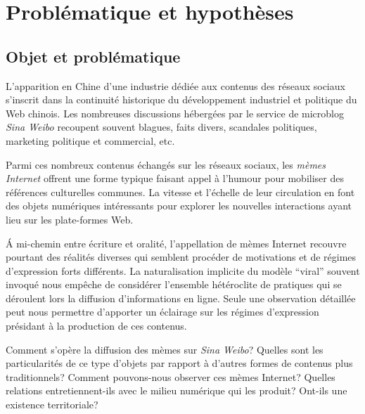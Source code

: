 \chapter*{Problématique et hypothèses}




\section*{Objet et problématique}

L'apparition en Chine d'une industrie dédiée aux contenus des réseaux sociaux s'inscrit dans la continuité historique du développement industriel et politique du Web chinois. Les nombreuses discussions hébergées par le service de microblog \textit{Sina Weibo} recoupent souvent blagues, faits divers, scandales politiques, marketing politique et commercial, etc.

Parmi ces nombreux contenus échangés sur les réseaux sociaux, les \textit{mèmes Internet} offrent une forme typique faisant appel à l'humour pour mobiliser des références culturelles communes. La vitesse et l'échelle de leur circulation en font des objets numériques intéressants pour explorer les nouvelles interactions ayant lieu sur les plate-formes Web.

\'A mi-chemin entre écriture et oralité, l’appellation de mèmes Internet recouvre pourtant des réalités diverses qui semblent procéder de motivations et de régimes d'expression forts différents. La naturalisation implicite du modèle ``viral'' souvent invoqué nous empêche de considérer l'ensemble hétéroclite de pratiques qui se déroulent lors la diffusion d'informations en ligne. Seule une observation détaillée peut nous permettre d'apporter un éclairage sur les régimes d'expression présidant à la production de ces contenus.

Comment s'opère la diffusion des mèmes sur \textit{Sina Weibo}? Quelles sont les particularités de ce type d'objets par rapport à d'autres formes de contenus plus traditionnels? Comment pouvons-nous observer ces mèmes Internet? Quelles relations entretiennent-ils avec le milieu numérique qui les produit? Ont-ils une existence territoriale?

